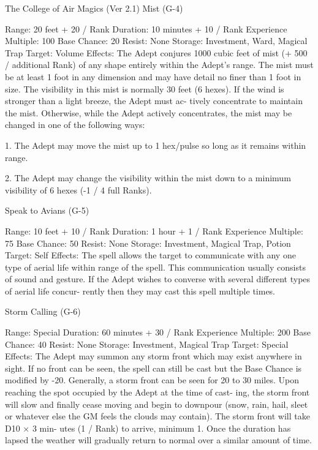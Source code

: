 \begin{Chapter}{The College of Air Magics (Ver 2.1)}
Mist (G-4) 

Range: 20 feet + 20 / Rank 
Duration: 10 minutes + 10 / Rank 
Experience Multiple: 100 
Base Chance: 20%
Resist: None 
Storage: Investment, Ward, Magical Trap 
Target: Volume 
Effects: The Adept conjures 1000 cubic feet of mist 
(+  500  /  additional  Rank)  of  any  shape  entirely 
within the Adept’s range. The mist must be at least 
1  foot  in  any  dimension  and  may  have  detail  no 
finer than 1 foot in size. The visibility in this mist 
is  normally  30  feet  (6  hexes).  If  the  wind  is 
stronger  than  a  light  breeze,  the  Adept  must  ac-
tively concentrate to maintain the mist. Otherwise, 
while  the  Adept  actively  concentrates,  the  mist 
may be changed in one of the following ways: 

1. The Adept may move the mist up to 1 hex/pulse 
so long as it remains within range. 

2.  The  Adept  may  change  the  visibility  within  the 
mist down to a minimum visibility of 6 hexes (-1 / 
4 full Ranks). 

Speak to Avians (G-5) 

Range: 10 feet + 10 / Rank 
Duration: 1 hour + 1 / Rank 
Experience Multiple: 75 
Base Chance: 50%
Resist: None 
Storage: Investment, Magical Trap, Potion 
Target: Self 
Effects: The spell allows the target to communicate 
with any one type of aerial life within range of the 
spell.  This  communication  usually  consists  of 
sound and gesture. If the Adept wishes to converse 
with  several  different  types  of  aerial  life  concur-
rently then they may cast this spell multiple times. 

Storm Calling (G-6) 

Range: Special 
Duration: 60 minutes + 30 / Rank 
Experience Multiple: 200 
Base Chance: 40%
Resist: None 
Storage: Investment, Magical Trap 
Target: Special 
Effects:  The  Adept  may  summon  any  storm  front 
which may exist anywhere in sight. If no front can 
be  seen,  the  spell  can  still  be  cast  but  the  Base 
Chance  is  modified  by  -20.  Generally,  a  storm 
front can be seen for 20 to 30 miles. Upon reaching 
the spot occupied by the Adept at the time of cast-
ing,  the  storm  front  will  slow  and  finally  cease 
moving  and  begin  to  downpour  (snow,  rain,  hail, 
sleet or whatever else the GM feels the clouds may 
contain).  The  storm  front  will  take  D10  ×  3  min-
utes  (1  /  Rank)  to  arrive,  minimum  1.  Once  the 
duration  has  lapsed  the  weather  will  gradually 
return to normal over a similar amount of time. 


\end{Chapter}
